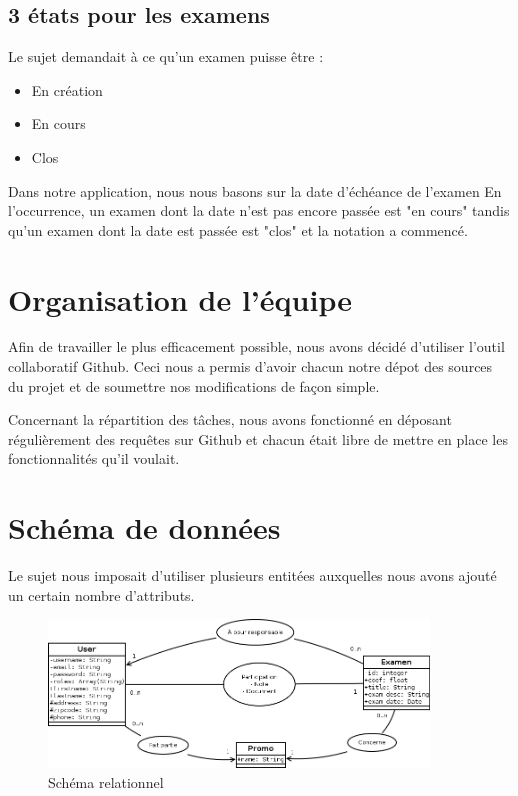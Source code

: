 \documentclass{report}
\begin{document}
      \subsection{3 états pour les examens}
        Le sujet demandait à ce qu'un examen puisse être :

        \begin{itemize}
          \item{En création}
          \item{En cours}
          \item{Clos}
        \end{itemize}

        Dans notre application, nous nous basons sur la date d'échéance de l'examen
        En l'occurrence, un examen dont la date n'est pas encore passée est "en cours"
        tandis qu'un examen dont la date est passée est "clos" et la notation a commencé.
  \section{Organisation de l'équipe}
  	Afin de travailler le plus efficacement possible, nous avons décidé d'utiliser l'outil collaboratif Github. Ceci nous a permis d'avoir chacun notre dépot des sources du projet et de soumettre nos modifications de façon simple.
  	
  	Concernant la répartition des tâches, nous avons fonctionné en déposant régulièrement des requêtes sur Github et chacun était libre de mettre en place les fonctionnalités qu'il voulait.
  	
  \section{Schéma de données}
    Le sujet nous imposait d'utiliser plusieurs entitées auxquelles nous avons 
    ajouté un certain nombre d'attributs.

    \begin{figure}
      \includegraphics[width=0.9\textwidth]{./data.png}
      \caption{Schéma relationnel}
    \end{figure}
\end{document}
